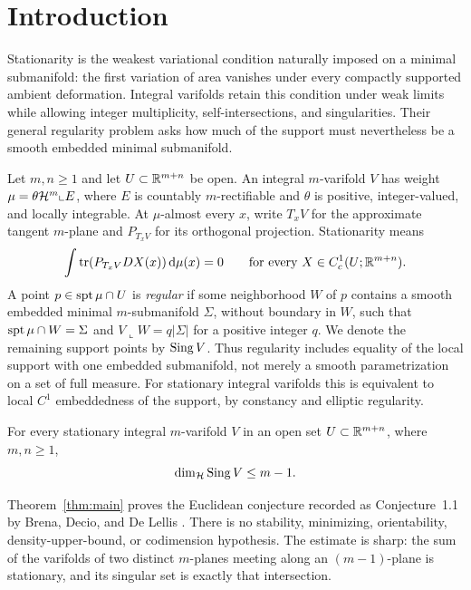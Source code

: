 \section{Introduction}\label{sec:introduction}

Stationarity is the weakest variational condition naturally imposed on a
minimal submanifold: the first variation of area vanishes under every
compactly supported ambient deformation. Integral varifolds retain this
condition under weak limits while allowing integer multiplicity,
self-intersections, and singularities. Their general regularity problem
asks how much of the support must nevertheless be a smooth embedded
minimal submanifold.

Let $m,n\ge1$ and let $U\subset\mathbb R^{m+n}$ be open. An integral
$m$-varifold $V$ has weight
$\mu=\theta\mathcal H^m\llcorner E$, where $E$ is countably $m$-rectifiable
and $\theta$ is positive, integer-valued, and locally integrable.
At $\mu$-almost every $x$, write $T_xV$ for the approximate tangent
$m$-plane and $P_{T_xV}$ for its orthogonal projection. Stationarity means
\begin{equation}\label{eq:stationarity}
 \int\operatorname{tr}(P_{T_xV}DX(x))\,\mathrm d\mu(x)=0
 \qquad\text{for every }X\in C_c^1(U;\mathbb R^{m+n}).
\end{equation}
A point $p\in\operatorname{spt}\mu\cap U$ is \emph{regular} if some neighborhood $W$
of $p$ contains a smooth embedded minimal $m$-submanifold $\Sigma$,
without boundary in $W$, such that $\operatorname{spt}\mu\cap W=\Sigma$ and
$V\llcorner W=q|\Sigma|$ for a positive integer $q$.
We denote the remaining support points by
$\operatorname{Sing} V$. Thus regularity includes equality of the local support with
one embedded submanifold, not merely a smooth parametrization on a set
of full measure.
For stationary integral varifolds this is equivalent to local $C^1$
embeddedness of the support, by constancy and elliptic regularity.

\begin{theorem}\label{thm:main}
For every stationary integral $m$-varifold $V$ in an open set
$U\subset\mathbb R^{m+n}$, where $m,n\ge1$,
\[
 \dim_{\mathcal H}\operatorname{Sing} V\le m-1.
\]
\end{theorem}

Theorem~\ref{thm:main} proves the Euclidean conjecture recorded as
Conjecture~1.1 by Brena, Decio, and De Lellis \cite{BDD2025}.
There is no stability, minimizing, orientability, density-upper-bound,
or codimension hypothesis. The estimate is sharp: the sum of the
varifolds of two distinct $m$-planes meeting along an $(m-1)$-plane is
stationary, and its singular set is exactly that intersection.

